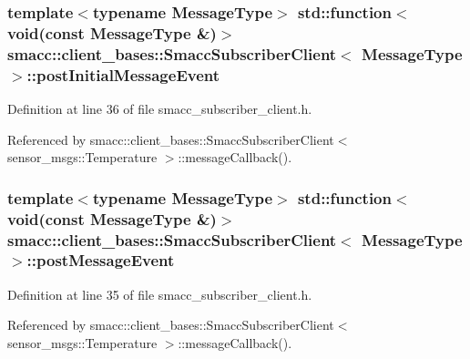 \subsubsection[{\texorpdfstring{post\+Initial\+Message\+Event}{postInitialMessageEvent}}]{\setlength{\rightskip}{0pt plus 5cm}template$<$typename Message\+Type$>$ std\+::function$<$void(const Message\+Type \&)$>$ {\bf smacc\+::client\+\_\+bases\+::\+Smacc\+Subscriber\+Client}$<$ Message\+Type $>$\+::post\+Initial\+Message\+Event}\hypertarget{classsmacc_1_1client__bases_1_1SmaccSubscriberClient_ac184f4c0a6e924ceb9eecc71d6252106}{}\label{classsmacc_1_1client__bases_1_1SmaccSubscriberClient_ac184f4c0a6e924ceb9eecc71d6252106}


Definition at line 36 of file smacc\+\_\+subscriber\+\_\+client.\+h.



Referenced by smacc\+::client\+\_\+bases\+::\+Smacc\+Subscriber\+Client$<$ sensor\+\_\+msgs\+::\+Temperature $>$\+::message\+Callback().

\subsubsection[{\texorpdfstring{post\+Message\+Event}{postMessageEvent}}]{\setlength{\rightskip}{0pt plus 5cm}template$<$typename Message\+Type$>$ std\+::function$<$void(const Message\+Type \&)$>$ {\bf smacc\+::client\+\_\+bases\+::\+Smacc\+Subscriber\+Client}$<$ Message\+Type $>$\+::post\+Message\+Event}\hypertarget{classsmacc_1_1client__bases_1_1SmaccSubscriberClient_ad71ae0708e8a3ea321de985076d8b0ac}{}\label{classsmacc_1_1client__bases_1_1SmaccSubscriberClient_ad71ae0708e8a3ea321de985076d8b0ac}


Definition at line 35 of file smacc\+\_\+subscriber\+\_\+client.\+h.



Referenced by smacc\+::client\+\_\+bases\+::\+Smacc\+Subscriber\+Client$<$ sensor\+\_\+msgs\+::\+Temperature $>$\+::message\+Callback().

